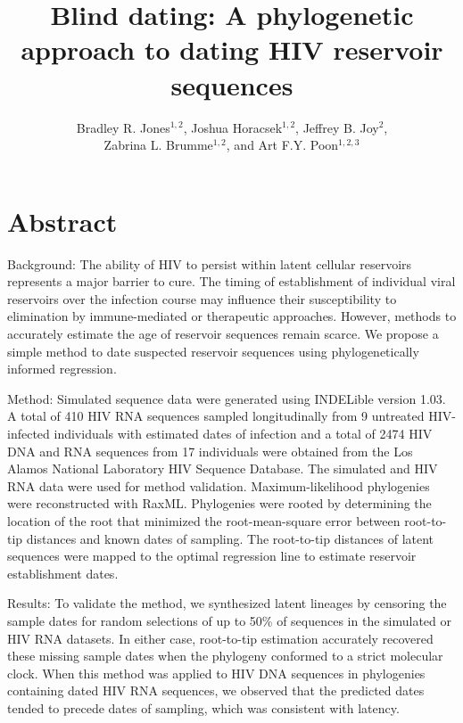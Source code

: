 \documentclass[12pt]{article}
\begin{document}
\title{Blind dating: A phylogenetic approach to dating HIV reservoir sequences}

\author{Bradley R. Jones$^{1,2}$, Joshua Horacsek$^{1,2}$, Jeffrey B. Joy$^2$, \\ Zabrina L. Brumme$^{1,2}$, and Art F.Y. Poon$^{1,2,3}$}
\baselineskip 22pt
\pagewiselinenumbers

\date{}
\maketitle

\section * {Abstract}

Background: 
The ability of HIV to persist within latent cellular reservoirs represents a major barrier to cure.
The timing of establishment of individual viral reservoirs over the infection course may influence their susceptibility to elimination by immune-mediated or therapeutic approaches.
However, methods to accurately estimate the age of reservoir sequences remain scarce.
We propose a simple method to date suspected reservoir sequences using phylogenetically informed regression.

Method: 
Simulated sequence data were generated using INDELible version 1.03.
A total of 410 HIV RNA sequences sampled longitudinally from 9 untreated HIV-infected individuals with estimated dates of infection and a total of 2474 HIV DNA and RNA sequences from 17 individuals were obtained from the Los Alamos National Laboratory HIV Sequence Database.
The simulated and HIV RNA data were used for method validation. Maximum-likelihood phylogenies were reconstructed with RaxML.
Phylogenies were rooted by determining the location of the root that minimized the root-mean-square error between root-to-tip distances and known dates of sampling. The root-to-tip distances of latent sequences were mapped to the optimal regression line to estimate reservoir establishment dates.

Results: 
To validate the method, we synthesized latent lineages by censoring the sample dates for random selections of up to 50\% of sequences in the simulated or HIV RNA datasets.
In either case, root-to-tip estimation accurately recovered these missing sample dates when the phylogeny conformed to a strict molecular clock.
When this method was applied to HIV DNA sequences in phylogenies containing dated HIV RNA sequences, we observed that the predicted dates tended to precede dates of sampling, which was consistent with latency.
\end{document}
